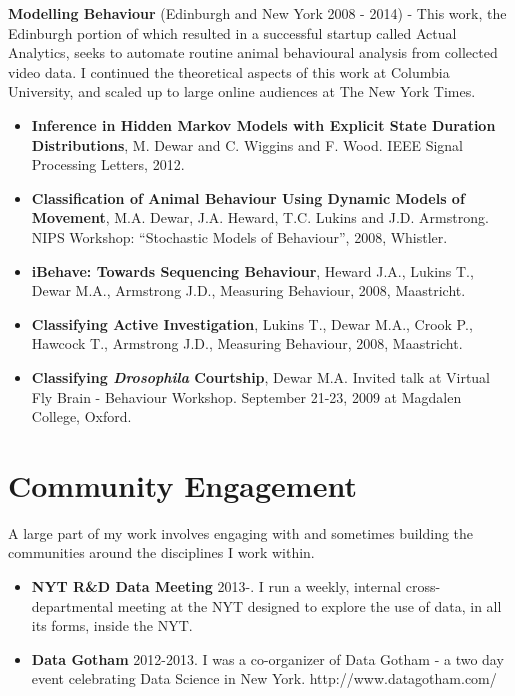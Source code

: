 \documentclass{res}
\begin{document}
\begin{resume}
\textbf{Modelling Behaviour} (Edinburgh and New York 2008 - 2014) - This work, the Edinburgh portion of which resulted in a successful startup called Actual Analytics, seeks to automate routine animal behavioural analysis from collected video data. I continued the theoretical aspects of this work at Columbia University, and scaled up to large online audiences at The New York Times.
    \begin{itemize}
        \item {\bf Inference in Hidden {M}arkov Models with Explicit State Duration Distributions}, M. Dewar and C. Wiggins and F. Wood. IEEE Signal Processing Letters, 2012.
        \item {\bf Classification of Animal Behaviour Using Dynamic Models of Movement},     M.A. Dewar, J.A. Heward, T.C. Lukins and J.D. Armstrong. NIPS Workshop: ``Stochastic Models of Behaviour'', 2008, Whistler. 
        \item {\bf iBehave: Towards Sequencing Behaviour}, Heward J.A., Lukins T., Dewar M.A., Armstrong J.D., Measuring Behaviour, 2008, Maastricht.
        \item {\bf Classifying Active Investigation}, Lukins T., Dewar M.A., Crook P., Hawcock T., Armstrong J.D., Measuring Behaviour, 2008, Maastricht.
	\item {\bf Classifying \emph{Drosophila} Courtship}, Dewar M.A. Invited talk at Virtual Fly Brain - Behaviour Workshop. September 21-23, 2009 at Magdalen College, Oxford.
    \end{itemize}

\section{Community Engagement}

A large part of my work involves engaging with and sometimes building the communities around the disciplines I work within. 
\begin{itemize}
  \item {\bf NYT R\&D Data Meeting} 2013-. I run a weekly, internal cross-departmental meeting at the NYT designed to explore the use of data, in all its forms, inside the NYT. 
  \item {\bf Data Gotham} 2012-2013. I was a co-organizer of Data Gotham - a two day event celebrating Data Science in New York. http://www.datagotham.com/
  

\end{itemize}
\end{resume}
\end{document}
